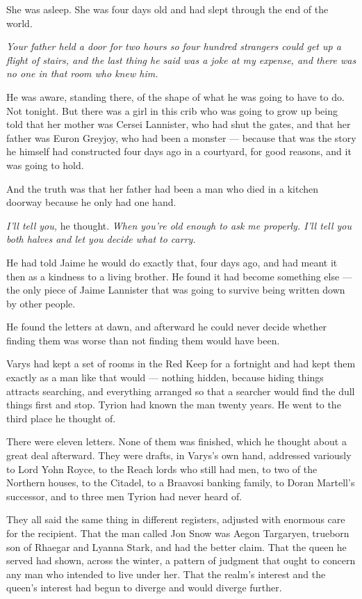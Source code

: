 She was asleep. She was four days old and had slept through the end of the world.

\textit{Your father held a door for two hours so four hundred strangers could get up a flight of stairs, and the last thing he said was a joke at my expense, and there was no one in that room who knew him.}

He was aware, standing there, of the shape of what he was going to have to do. Not tonight. But there was a girl in this crib who was going to grow up being told that her mother was Cersei Lannister, who had shut the gates, and that her father was Euron Greyjoy, who had been a monster — because that was the story he himself had constructed four days ago in a courtyard, for good reasons, and it was going to hold.

And the truth was that her father had been a man who died in a kitchen doorway because he only had one hand.

\textit{I’ll tell you,} he thought. \textit{When you’re old enough to ask me properly. I’ll tell you both halves and let you decide what to carry.}

He had told Jaime he would do exactly that, four days ago, and had meant it then as a kindness to a living brother. He found it had become something else — the only piece of Jaime Lannister that was going to survive being written down by other people.

\sceneBreak

He found the letters at dawn, and afterward he could never decide whether finding them was worse than not finding them would have been.

Varys had kept a set of rooms in the Red Keep for a fortnight and had kept them exactly as a man like that would — nothing hidden, because hiding things attracts searching, and everything arranged so that a searcher would find the dull things first and stop. Tyrion had known the man twenty years. He went to the third place he thought of.

There were eleven letters. None of them was finished, which he thought about a great deal afterward. They were drafts, in Varys’s own hand, addressed variously to Lord Yohn Royce, to the Reach lords who still had men, to two of the Northern houses, to the Citadel, to a Braavosi banking family, to Doran Martell’s successor, and to three men Tyrion had never heard of.

They all said the same thing in different registers, adjusted with enormous care for the recipient. That the man called Jon Snow was Aegon Targaryen, trueborn son of Rhaegar and Lyanna Stark, and had the better claim. That the queen he served had shown, across the winter, a pattern of judgment that ought to concern any man who intended to live under her. That the realm’s interest and the queen’s interest had begun to diverge and would diverge further.

